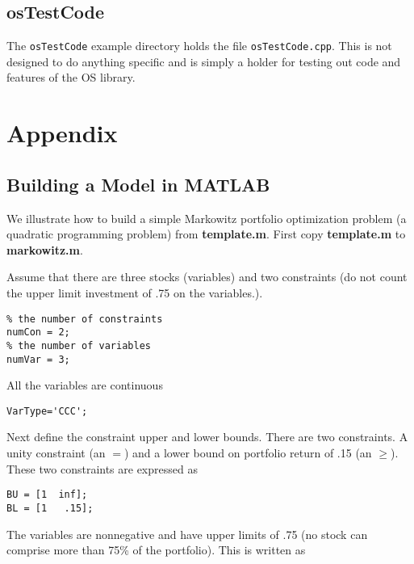 \documentclass[11pt]{article}
\renewcommand{\_}{{\char"5F}}
\renewcommand{\{}{{\char"7B}}
\renewcommand{\}}{{\char"7D}}
\renewcommand{\^}{{\char"0D}}
\renewcommand{\'}{{\char"0D}}
\begin{document}
\subsection{osTestCode}\label{subsection:exampleOSInstanceGeneration}

The {\tt osTestCode} example directory holds the file {\tt osTestCode.cpp}. This is not designed to do anything specific and is simply a holder for testing out code and features of the OS library.

\section{Appendix}\label{section:appendix}


\subsection{Building a Model in MATLAB}

We illustrate how to build a simple Markowitz portfolio optimization problem (a quadratic programming problem) from {\bf template.m}. First copy {\bf template.m} to {\bf markowitz.m}. 

Assume that there are three stocks (variables) and two constraints (do not count the upper limit investment of .75 on the variables.).


\begin{verbatim}
% the number of constraints
numCon = 2;
% the number of variables
numVar = 3;
\end{verbatim}



All the variables are continuous


\begin{verbatim}
VarType='CCC';
\end{verbatim}


Next define the constraint upper and lower bounds. There are two constraints. A unity constraint (an $=$) and a lower bound on portfolio return of .15 (an $\ge$). These two constraints are expressed as



\begin{verbatim}
BU = [1  inf];
BL = [1   .15];
\end{verbatim}



The variables are nonnegative and have upper limits of .75 (no stock can comprise more than 75\% of the portfolio).  This is written as
\end{document}
